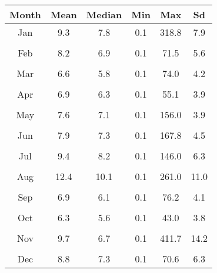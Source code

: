 
\begin{tabular}{cccccc}
\toprule
Month & Mean & Median & Min & Max & Sd\\
\midrule
Jan & 9.3 & 7.8 & 0.1 & 318.8 & 7.9\\
\\[-3.0ex]
Feb & 8.2 & 6.9 & 0.1 & 71.5 & 5.6\\
\\[-3.0ex]
Mar & 6.6 & 5.8 & 0.1 & 74.0 & 4.2\\
\\[-3.0ex]
Apr & 6.9 & 6.3 & 0.1 & 55.1 & 3.9\\
\\[-3.0ex]
May & 7.6 & 7.1 & 0.1 & 156.0 & 3.9\\
\\[-3.0ex]
Jun & 7.9 & 7.3 & 0.1 & 167.8 & 4.5\\
\\[-3.0ex]
Jul & 9.4 & 8.2 & 0.1 & 146.0 & 6.3\\
\\[-3.0ex]
Aug & 12.4 & 10.1 & 0.1 & 261.0 & 11.0\\
\\[-3.0ex]
Sep & 6.9 & 6.1 & 0.1 & 76.2 & 4.1\\
\\[-3.0ex]
Oct & 6.3 & 5.6 & 0.1 & 43.0 & 3.8\\
\\[-3.0ex]
Nov & 9.7 & 6.7 & 0.1 & 411.7 & 14.2\\
\\[-3.0ex]
Dec & 8.8 & 7.3 & 0.1 & 70.6 & 6.3\\
\bottomrule
\end{tabular}
